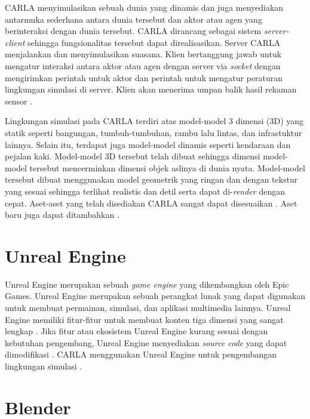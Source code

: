 CARLA menyimulasikan sebuah dunia yang dinamis dan juga menyediakan antarmuka
sederhana antara dunia tersebut dan aktor atau agen yang berinteraksi dengan
dunia tersebut. CARLA dirancang sebagai sistem \textit{server-client} sehingga
fungsionalitas tersebut dapat direalisasikan. Server CARLA menjalankan dan
menyimulasikan suasana. Klien bertanggung jawab untuk mengatur interaksi antara
aktor atau agen dengan server via \textit{socket} dengan mengirimkan perintah
untuk aktor dan perintah untuk mengatur peraturan lingkungan simulasi di server.
Klien akan menerima umpan balik hasil rekaman sensor
\parencite{carla-dosovitskiy}.

Lingkungan simulasi pada CARLA terdiri atas model-model 3 dimensi (3D) yang
statik seperti bangungan, tumbuh-tumbuhan, rambu lalu lintas, dan infrastuktur
lainnya. Selain itu, terdapat juga model-model dinamis seperti kendaraan dan
pejalan kaki. Model-model 3D tersebut telah dibuat sehingga dimensi model-model
tersebut mencerminkan dimensi objek aslinya di dunia nyata. Model-model tersebut
dibuat menggunakan model geometrik yang ringan dan dengan tekstur yang sesuai
sehingga terlihat realistis dan detil serta dapat di-\textit{render} dengan
cepat. Aset-aset yang telah disediakan CARLA sangat dapat disesuaikan
\parencite{carla-dosovitskiy}. Aset baru juga dapat ditambahkan
\parencite{carla-documentation-intro}.


\section{Unreal Engine}

Unreal Engine merupakan sebuah \textit{game engine} yang dikembangkan oleh Epic
Games. Unreal Engine merupakan sebuah perangkat lunak yang dapat digunakan untuk
membuat permainan, simulasi, dan aplikasi multimedia lainnya. Unreal Engine
memiliki fitur-fitur untuk membuat konten tiga dimensi yang sangat lengkap
\parencite{ue-5}. Jika fitur atau ekosistem Unreal Engine kurang sesuai dengan
kebutuhan pengembang, Unreal Engine menyediakan \textit{source code} yang dapat
dimodifikasi \parencite{ue-4}. CARLA menggunakan Unreal Engine untuk
pengembangan lingkungan simulasi \parencite{carla-documentation-build}.


\section{Blender}

